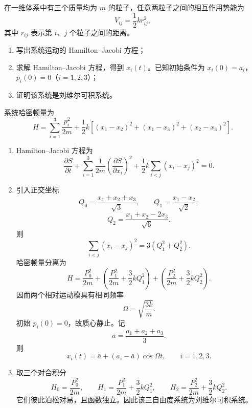 \begin{question}[三粒子一维体系]
在一维体系中有三个质量均为 $m$ 的粒子，任意两粒子之间的相互作用势能为
\[
  V_{ij}=\frac12k r_{ij}^2,
\]
其中 $r_{ij}$ 表示第 $i$、$j$ 个粒子之间的距离。
\begin{enumerate}
  \item 写出系统运动的 Hamilton--Jacobi 方程；
  \item 求解 Hamilton--Jacobi 方程，得到 $x_i(t)$。已知初始条件为 $x_i(0)=a_i$，$p_i(0)=0$（$i=1,2,3$）；
  \item 证明该系统是刘维尔可积系统。
\end{enumerate}

\begin{solution}
系统哈密顿量为
\[
  H=\sum_{i=1}^3\frac{p_i^2}{2m}
  +\frac12k\left[(x_1-x_2)^2+(x_1-x_3)^2+(x_2-x_3)^2\right].
\]
\begin{enumerate}
  \item Hamilton--Jacobi 方程为
  \[
    \frac{\partial S}{\partial t}
    +\sum_{i=1}^3\frac1{2m}\left(\frac{\partial S}{\partial x_i}\right)^2
    +\frac12k\sum_{i<j}(x_i-x_j)^2=0.
  \]
  \item 引入正交坐标
  \[
    Q_0=\frac{x_1+x_2+x_3}{\sqrt3},
    \qquad
    Q_1=\frac{x_1-x_2}{\sqrt2},
  \]
  \[
    Q_2=\frac{x_1+x_2-2x_3}{\sqrt6}.
  \]
  则
  \[
    \sum_{i<j}(x_i-x_j)^2=3(Q_1^2+Q_2^2).
  \]
  哈密顿量分离为
  \[
    H=\frac{P_0^2}{2m}
    +\left(\frac{P_1^2}{2m}+\frac32kQ_1^2\right)
    +\left(\frac{P_2^2}{2m}+\frac32kQ_2^2\right).
  \]
  因而两个相对运动模具有相同频率
  \[
    \Omega=\sqrt{\frac{3k}{m}}.
  \]
  初始 $p_i(0)=0$，故质心静止。记
  \[
    \bar a=\frac{a_1+a_2+a_3}{3}.
  \]
  则
  \[
    \boxed{x_i(t)=\bar a+(a_i-\bar a)\cos\Omega t,
    \qquad i=1,2,3.}
  \]
  \item 取三个对合积分
  \[
    H_0=\frac{P_0^2}{2m},
    \qquad
    H_1=\frac{P_1^2}{2m}+\frac32kQ_1^2,
    \qquad
    H_2=\frac{P_2^2}{2m}+\frac32kQ_2^2.
  \]
  它们彼此泊松对易，且函数独立。因此该三自由度系统为刘维尔可积系统。
\end{enumerate}
\end{solution}
\end{question}

